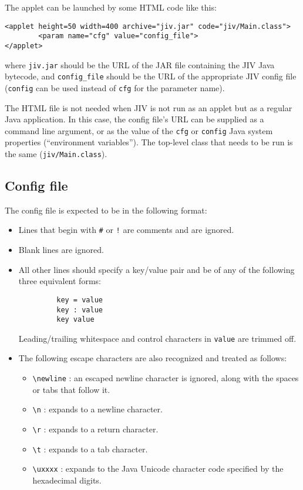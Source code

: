 The applet can be launched by some HTML code like this:
\begin{verbatim}
<applet height=50 width=400 archive="jiv.jar" code="jiv/Main.class">
        <param name="cfg" value="config_file">
</applet>
\end{verbatim}
where \verb+jiv.jar+ should be the URL of the JAR file containing the
JIV Java bytecode, and \verb+config_file+ should be the URL of the
appropriate JIV config file (\verb+config+ can be used instead of
\verb+cfg+ for the parameter name).

The HTML file is not needed when JIV is not run as an applet but as a
regular Java application. In this case, the config file's URL can be
supplied as a command line argument, or as the value of the \verb+cfg+
or \verb+config+ Java system properties (``environment variables'').
The top-level class that needs to be run is the same
(\verb+jiv/Main.class+).

\subsection{Config file}
\label{sec:config-file}

The config file is expected to be in the following format:
\begin{itemize}
\item Lines that begin with \verb|#| or \verb|!| are comments and are
  ignored. 
\item Blank lines are ignored.
\item All other lines should specify a key/value pair and be of any of
  the following three equivalent forms:
\begin{verbatim}
         key = value
         key : value
         key value
\end{verbatim}
  Leading/trailing whitespace and control characters in \verb|value|
  are trimmed off.
\item The following escape characters are also recognized and
  treated as follows: 
  \begin{itemize}
  \item \verb|\newline| : 
    an escaped newline character is ignored, along with the spaces or
    tabs that follow it. 
  \item \verb|\n| : expands to a newline character.
  \item \verb|\r| : expands to a return character.
  \item \verb|\t| : expands to a tab character.
  \item \verb|\uxxxx| : expands to the Java Unicode character code
    specified by the hexadecimal digits.  
  \end{itemize}
\end{itemize} 

